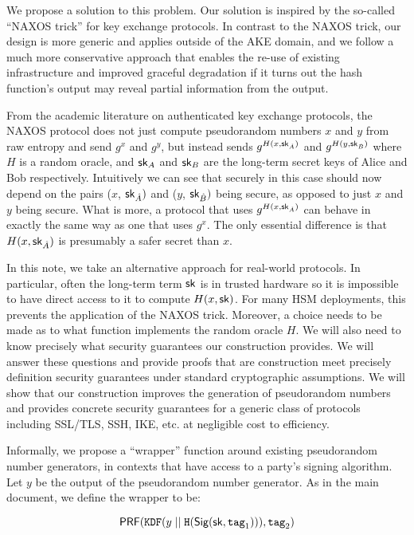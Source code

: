 \documentclass[12pt]{article}
\newcommand{\myconcat}{ \;||\; }
\begin{document}
We propose a solution to this problem. Our solution is inspired by the
so-called ``NAXOS trick'' for key exchange protocols. In contrast to the
NAXOS trick, our design is more generic and applies outside of the AKE
domain, and we follow a much more conservative approach that enables the
re-use of existing infrastructure and improved graceful degradation if
it turns out the hash function's output may reveal partial information
from the output.

From the academic literature on authenticated key exchange protocols, the NAXOS protocol \cite{LaMacchiaeCK2007} does not just compute pseudorandom numbers $x$ and $y$ from raw entropy and send $g^{x}$ and $g^{y}$, but instead sends $g^{H(x, \mathsf{sk}_{\hat A})}$ and $g^{H(y, \mathsf{sk}_{\hat B})}$ where $H$ is a random oracle, and $\mathsf{sk}_{A}$ and $\mathsf{sk}_{B}$ are the long-term secret keys of Alice and Bob respectively. Intuitively we can see that securely in this case should now depend on the pairs ($x$, $\mathsf{sk}_{\hat A})$ and ($y$, $\mathsf{sk}_{\hat B})$ being secure, as opposed to just $x$ and $y$ being secure. What is more, a protocol that uses $g^{H(x, \mathsf{sk}_{\hat A})}$ can behave in exactly the same way as one that uses $g^x$. The only essential difference is that $H(x, \mathsf{sk}_{\hat A})$ is presumably a safer secret than $x$.

In this note, we take an alternative approach for real-world protocols.
In particular, often the long-term term $\mathsf{sk}$ is in trusted hardware so
it is impossible to have direct access to it to compute $H(x, \mathsf{sk})$.
For many HSM deployments, this prevents the application of the NAXOS
trick.
Moreover, a choice needs to be made as to what function implements the
random oracle $H$. We will also need to know precisely what security
guarantees our construction provides.  We will answer these questions
and provide proofs that are construction meet precisely definition
security guarantees under standard cryptographic assumptions. We will
show that our construction improves the generation of pseudorandom
numbers and provides concrete security guarantees for a generic class of
protocols including SSL/TLS, SSH, IKE, etc. at negligible cost to efficiency. 

Informally, we propose a ``wrapper'' function around existing
pseudorandom number generators, in contexts that have access to a
party's signing algorithm. Let $y$ be the output of the pseudorandom
number generator. As in the main document, we define the wrapper to be:

$$
\prf(\texttt{KDF}(y \myconcat \texttt{H}(\sig (\sk, \mathrm{\texttt{tag}_1}))), \texttt{tag}_2 )
$$
\end{document}
